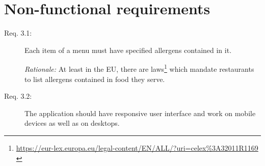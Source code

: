 \section{Non-functional requirements}
\begin{description}
    \item [Req. 3.1:] Each item of a menu must have specified allergens contained in it.
    
    \emph{Rationale:} At least in the EU, there are laws\footnote{\url{https://eur-lex.europa.eu/legal-content/EN/ALL/?uri=celex\%3A32011R1169}  \label{fnlabel}} which mandate restaurants to list allergens contained in food they serve.
    \item [Req. 3.2:] The application should have responsive user interface and work on mobile devices as well as on desktops.
\end{description}

\vspace*{\fill}
\pagebreak
